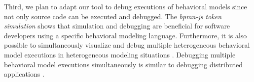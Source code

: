 \documentclass[conference]{IEEEtran}
\begin{document}
Third, we plan to adapt our tool to debug executions of behavioral models since not only source code can be executed and debugged.
The \textit{bpmn-js token simulation} shows that simulation and debugging are beneficial for software developers using a specific behavioral modeling language.
Furthermore, it is also possible to simultaneously visualize and debug multiple heterogeneous behavioral model executions in heterogeneous modeling situations \cite{krauterBehavioralConsistencyHeterogeneous2021}. %
Debugging multiple behavioral model executions simultaneously is similar to debugging distributed applications \cite{kochGraphicalDebuggingDistributed2015}.
\newpage


\end{document}
